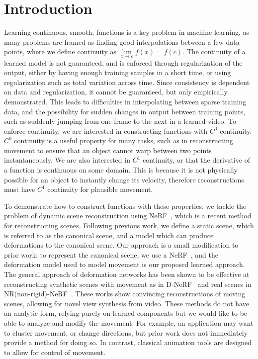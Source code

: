 \section*{Introduction}

Learning continuous, smooth, functions is a key problem in machine learning, as many problems
are framed as finding good interpolations between a few data points, where we define continuity as $\lim\limits_{x\to c}f(x) = f(c)$.
The continuity of a learned model is not guaranteed, and is enforced through regularization of the output, either by having enough training samples in a short time, or
using regularization such as total variation across time. Since consistency is dependent on data and regularization, it cannot be guaranteed, but only empirically demonstrated. This leads to difficulties in interpolating between sparse training data, and the possibility for sudden changes in output between training points, such as suddenly jumping from one frame to the next in a learned video.
To enforce continuity, we are interested in constructing functions with $C^0$ continuity. $C^0$ continuity is a useful property for many tasks, such as in reconstructing movement to ensure that an object cannot warp between two points instantaneously. We are also interested in $C^1$ continuity, or that the derivative of a function is continuous on some domain. This is because it is not physically possible for an object to instantly change its velocity, therefore reconstructions must have $C^1$ continuity for plausible movement.

To demonstrate how to construct functions with these properties, we tackle the problem of dynamic scene reconstruction using NeRF~\cite{mildenhall2020nerf}, which is a recent method for reconstructing scenes. Following previous work, we define a static scene, which is referred to as the canonical scene, and a model which can produce deformations to the canonical scene. Our approach is a small modification to prior work: to represent the canonical scene, we use a NeRF~\cite{mildenhall2020nerf}, and the deformation model used to model movement is our proposed learned approach. The general approach of deformation networks has been shown to be effective at reconstructing synthetic scenes with movement as in D-NeRF~\cite{pumarola2020dnerf} and real scenes in NR(non-rigid)-NeRF~\cite{tretschk2021nonrigid}. These works show convincing
reconstructions of moving scenes, allowing for novel view synthesis from video. These methods do not have an analytic form, relying purely on learned components but we would like to be able to analyze and modify the movement. For example, an application may want to cluster movement, or change directions, but prior work does not immediately provide a method for doing so. In contrast, classical animation tools are designed to allow for control of movement.

